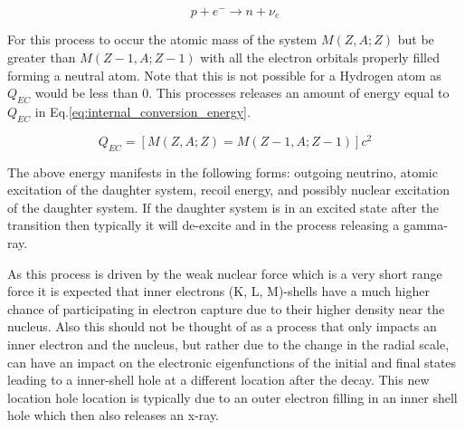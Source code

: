 \documentclass[jon_ringuette_thesis.tex]{subfiles}
\begin{document}
    \begin{equation}
        p + e^{-} \to n + \nu_e
        \label{eq:internal_conversion}
    \end{equation}

    For this process to occur the atomic mass of the system $M(Z, A; Z)$ but be greater than $M(Z-1, A; Z-1)$ with all the electron orbitals properly filled forming a neutral atom. Note that this is not possible for a Hydrogen atom as $Q_{EC}$ would be less than 0. This processes releases an amount of energy equal to $Q_{EC}$ in Eq.\ref{eq:internal_conversion_energy}.

    \begin{equation}
        Q_{EC} = [M(Z, A; Z) = M(Z-1, A; Z-1)]c^2
        \label{eq:internal_conversion_energy}
    \end{equation}

    The above energy manifests in the following forms: outgoing neutrino, atomic excitation of the daughter system, recoil energy, and possibly nuclear excitation of the daughter system.
    If the daughter system is in an excited state after the transition then typically it will de-excite and in the process releasing a gamma-ray.

    As this process is driven by the weak nuclear force which is a very short range force it is expected that inner electrons (K, L, M)-shells have a much higher chance of participating in electron capture due to their higher density near the nucleus. Also this should not be thought of as a process that only impacts an inner electron and the nucleus, but rather due to the change in the radial scale, can have an impact on the electronic eigenfunctions of the initial and final states leading to a inner-shell hole at a different location after the decay. This new location hole location is typically due to an outer electron filling in an inner shell hole which then also releases an x-ray.
\end{document}
